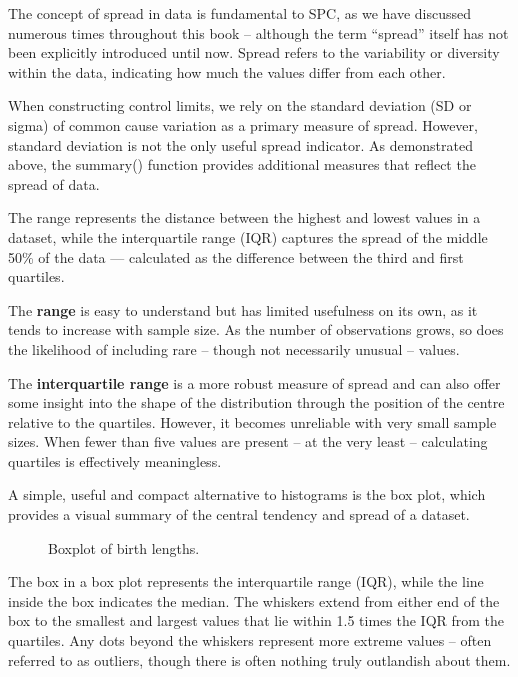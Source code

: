 \documentclass[
]{book}
\makeatletter
\newenvironment{Shaded}{\begin{snugshade}}{\end{snugshade}}
\newcommand{\FunctionTok}[1]{\textcolor[rgb]{0.13,0.29,0.53}{\textbf{#1}}}
\newcommand{\NormalTok}[1]{#1}
\newcommand{\SpecialCharTok}[1]{\textcolor[rgb]{0.81,0.36,0.00}{\textbf{#1}}}
\newcommand*\pandocbounded[1]{%
  \sbox\pandoc@box{#1}%
  \Gscale@div\@tempa{\textheight}{\dimexpr\ht\pandoc@box+\dp\pandoc@box\relax}%
  \Gscale@div\@tempb{\linewidth}{\wd\pandoc@box}%
  \ifdim\@tempb\p@<\@tempa\p@\let\@tempa\@tempb\fi%
  \ifdim\@tempa\p@<\p@\scalebox{\@tempa}{\usebox\pandoc@box}%
  \else\usebox{\pandoc@box}%
  \fi%
}
\makeatother
\begin{document}
The concept of spread in data is fundamental to SPC, as we have discussed numerous times throughout this book -- although the term ``spread'' itself has not been explicitly introduced until now. Spread refers to the variability or diversity within the data, indicating how much the values differ from each other.

When constructing control limits, we rely on the standard deviation (SD or sigma) of common cause variation as a primary measure of spread. However, standard deviation is not the only useful spread indicator. As demonstrated above, the summary() function provides additional measures that reflect the spread of data.

The range represents the distance between the highest and lowest values in a dataset, while the interquartile range (IQR) captures the spread of the middle 50\% of the data --- calculated as the difference between the third and first quartiles.

The \textbf{range} is easy to understand but has limited usefulness on its own, as it tends to increase with sample size. As the number of observations grows, so does the likelihood of including rare -- though not necessarily unusual -- values.

The \textbf{interquartile range} is a more robust measure of spread and can also offer some insight into the shape of the distribution through the position of the centre relative to the quartiles. However, it becomes unreliable with very small sample sizes. When fewer than five values are present -- at the very least -- calculating quartiles is effectively meaningless.

A simple, useful and compact alternative to histograms is the box plot, which provides a visual summary of the central tendency and spread of a dataset.

\begin{Shaded}
\end{Shaded}

\begin{figure}
\centering
\pandocbounded{}
\caption{\label{fig:stat-box1}Boxplot of birth lengths.}
\end{figure}

The box in a box plot represents the interquartile range (IQR), while the line inside the box indicates the median. The whiskers extend from either end of the box to the smallest and largest values that lie within 1.5 times the IQR from the quartiles. Any dots beyond the whiskers represent more extreme values -- often referred to as outliers, though there is often nothing truly outlandish about them.
\end{document}
